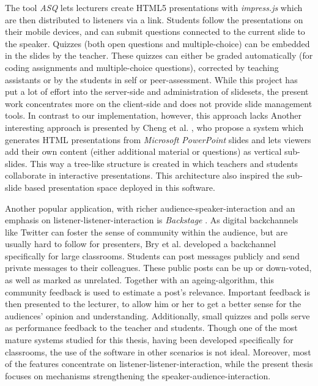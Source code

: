 The tool \emph{ASQ} \cite{Triglianos:InteractiveWebPresentationsImpress} lets lecturers create HTML5 presentations with \emph{impress.js} \cite{impressjs} which are then distributed to listeners via a link. Students follow the presentations on their mobile devices, and can submit questions connected to the current slide to the speaker. Quizzes (both open questions and multiple-choice) can be embedded in the slides by the teacher. These quizzes can either be graded automatically (for coding assignments and multiple-choice questions), corrected by teaching assistants or by the students in self or peer-assessment. While this project has put a lot of effort into the server-side and administration of slidesets, the present work concentrates more on the client-side and does not provide slide management tools. In contrast to our implementation, however, this approach lacks 
Another interesting approach is presented by Cheng et al. \cite{Cheng:TreebasedOnlinePresentations}, who propose a system which generates HTML presentations from \emph{Microsoft PowerPoint} slides and lets viewers add their own content (either additional material or questions) as vertical sub-slides. This way a tree-like structure is created in which teachers and students collaborate in interactive presentations. This architecture also inspired the sub-slide based presentation space deployed in this software.

Another popular application, with richer audience-spea\-ker-in\-ter\-ac\-tion and an emphasis on listener-listener-interaction is \emph{Backstage} \cite{backstage}. As digital backchannels like Twitter can foster the sense of community within the audience, but are usually hard to follow for presenters, Bry et al.\cite{Bry:Backstage} developed a backchannel specifically for large classrooms. Students can post messages publicly and send private messages to their colleagues. These public posts can be up or down-voted, as well as marked as unrelated. Together with an ageing-algorithm, this community feedback is used to estimate a post's relevance. Important feedback is then presented to the lecturer, to allow him or her to get a better sense for the audiences' opinion and understanding. Additionally, small quizzes and polls serve as performance feedback to the teacher and students. Though one of the most mature systems studied for this thesis, having been developed specifically for classrooms, the use of the software in other scenarios is not ideal. Moreover, most of the features concentrate on listener-listener-interaction, while the present thesis focuses on mechanisms strengthening the speaker-audience-interaction.

